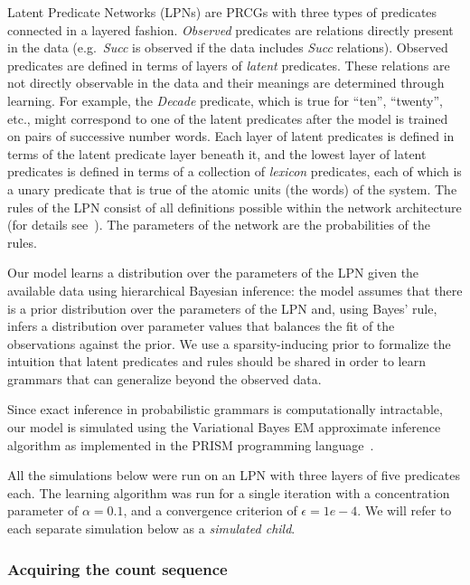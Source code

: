 \documentclass[10pt,letterpaper]{article}
\begin{document}
Latent Predicate Networks (LPNs) are PRCGs with three types of
predicates connected in a layered fashion. \emph{Observed} predicates
are relations directly present in the data (e.g.~\emph{Succ} is
observed if the data includes \emph{Succ} relations). Observed
predicates are defined in terms of layers of \emph{latent} predicates.
These relations are not directly observable in the data and their
meanings are determined through learning. For example, the
\emph{Decade} predicate, which is true for ``ten'', ``twenty'', etc.,
might correspond to one of the latent predicates after the model is
trained on pairs of successive number words. Each layer of latent
predicates is defined in terms of the latent predicate layer beneath
it, and the lowest layer of latent predicates is defined in terms of a
collection of \emph{lexicon} predicates, each of which is a unary
predicate that is true of the atomic units (the words) of the system.
The rules of the LPN consist of all definitions possible within the
network architecture (for details see~\cite{DecRulTen2015}). The
parameters of the network are the probabilities of the rules.

Our model learns a distribution over the parameters of the LPN given
the available data using hierarchical Bayesian inference: the model
assumes that there is a prior distribution over the parameters of the
LPN and, using Bayes' rule, infers a distribution over parameter
values that balances the fit of the observations against the prior. We
use a sparsity-inducing prior to formalize the intuition that latent
predicates and rules should be shared in order to learn grammars that
can generalize beyond the observed data.

Since exact inference in probabilistic grammars is computationally
intractable, our model is simulated using the Variational Bayes EM
approximate inference algorithm as implemented in the PRISM
programming language~\citep{sato2008variational}.

All the simulations below were run on an LPN with three layers of five
predicates each. The learning algorithm was run for a single
iteration with a concentration parameter of $\alpha=0.1$, and a convergence
criterion of $\epsilon=1e-4$. We will refer to each separate
simulation below as a \emph{simulated child}.

\subsubsection{Acquiring the count sequence}
\end{document}
